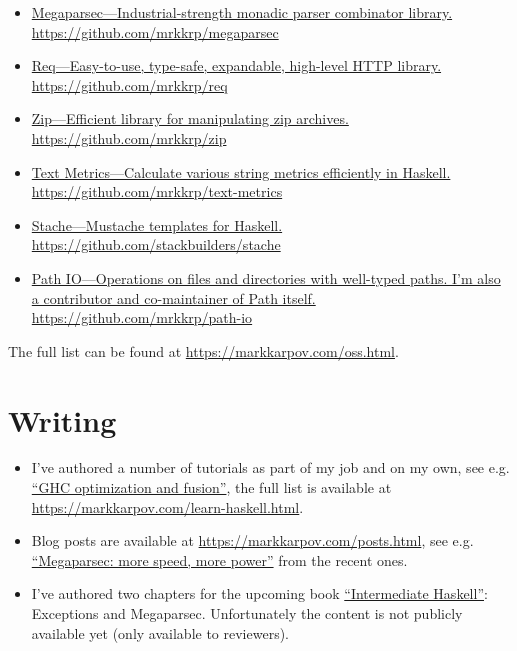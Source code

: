 \documentclass[a4paper,12pt]{article}
\begin{document}
\begin{itemize}[noitemsep]
\item \href{https://github.com/mrkkrp/megaparsec}
  {Megaparsec---Industrial-strength monadic parser combinator library.
    \newline
    https://github.com/mrkkrp/megaparsec}
\item \href{https://github.com/mrkkrp/req}
  {Req---Easy-to-use, type-safe, expandable, high-level HTTP library.
    \newline
    https://github.com/mrkkrp/req}
\item \href{https://github.com/mrkkrp/zip}
  {Zip---Efficient library for manipulating zip archives.
    \newline
    https://github.com/mrkkrp/zip}
\item \href{https://github.com/mrkkrp/text-metrics}
  {Text Metrics---Calculate various string metrics efficiently in Haskell.
    \newline
    https://github.com/mrkkrp/text-metrics}
\item \href{https://github.com/stackbuilders/stache}
  {Stache---Mustache templates for Haskell.
    \newline
    https://github.com/stackbuilders/stache}
\item \href{https://github.com/mrkkrp/path-io}
  {Path IO---Operations on files and directories with well-typed paths. I'm
    also a contributor and co-maintainer of Path itself.
    \newline
    https://github.com/mrkkrp/path-io}
\end{itemize}

The full list can be found at \href{https://markkarpov.com/oss.html}{https://markkarpov.com/oss.html}.

\section*{Writing}

\begin{itemize}[noitemsep]
\item I've authored a number of tutorials as part of my job and on my own,
  see e.g.
  \href{https://www.stackbuilders.com/tutorials/haskell/ghc-optimization-and-fusion/}{“GHC
    optimization and fusion”}, the full list is available at \\
  \href{https://markkarpov.com/learn-haskell.html}{https://markkarpov.com/learn-haskell.html}.
\item Blog posts are available at
  \href{https://markkarpov.com/posts.html}{https://markkarpov.com/posts.html},
  see e.g.
  \href{https://markkarpov.com/post/megaparsec-more-speed-more-power.html}{“Megaparsec:
    more speed, more power”} from the recent ones.
\item I've authored two chapters for the upcoming book
  \href{https://intermediatehaskell.com/}{“Intermediate Haskell”}:
  Exceptions and Megaparsec. Unfortunately the content is not publicly
  available yet (only available to reviewers).
\end{itemize}
\end{document}
